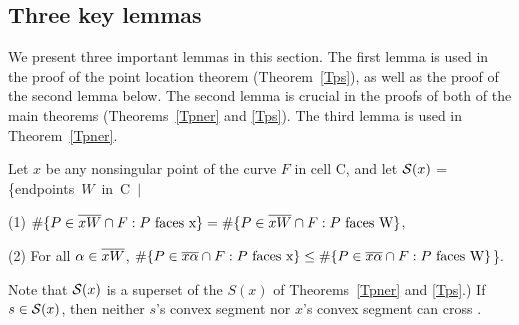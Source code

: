 
\subsection{Three key lemmas}

We present three important lemmas in this section.
The first lemma is used in the proof of the point location theorem (Theorem~\ref{Tps}),
as well as the proof of the second lemma below.
The second lemma is crucial in the proofs of both of the main theorems 
(Theorems~\ref{Tpner} and \ref{Tps}).
The third lemma is used in Theorem~\ref{Tpner}.

\begin{lemma}
\label{lem-argh}
Let $x$ be any nonsingular point of the curve $F$ in cell C, and
let ${\cal S}(x)$ = \mbox{\{endpoints $W$ in C $\mid$}

{\rm (1)} \mbox{$\#\{P \in\mbox{$\overline{xW}$}\cap F: P \mbox{ faces x}\} =
\#\{P \in \mbox{$\overline{xW}$}\cap F: P \mbox{ faces W} \}$},

{\rm (2)} For all $\alpha \in \mbox{$\overline{xW}$}$,
$\#\{P \in\mbox{$\overline{x\alpha}$}\cap F: P \mbox{ faces x}\} \leq
\#\{P \in \mbox{$\overline{x\alpha}$}\cap F: P \mbox{ faces W}\} $\}.

\vspace{.05in}

\noindent {\rm (}Note that 
${\cal S}(x)$ is a superset of the $S(x)$ of Theorems~{\rm \ref{Tpner}} and {\rm \ref{Tps}.)}
If $s \in {\cal S}(x)$, then neither $s$'s convex segment nor $x$'s convex 
segment can cross .
\end{lemma}
